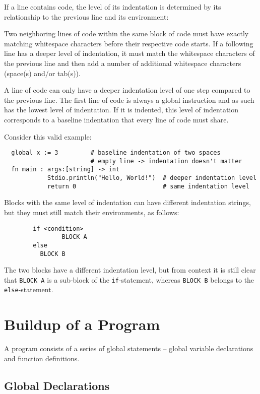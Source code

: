 \documentclass{article}
\newcommand{\code}[1]{\lstinline[columns=fixed]{#1}}
\begin{document}
		If a line contains code, the level of its indentation is determined by its relationship to the previous line and its environment:
		
		Two neighboring lines of code within the same block of code must have exactly matching whitespace characters before their respective code starts. If a following line has a deeper level of indentation, it must match the whitespace characters of the previous line and then add a number of additional whitespace characters (space(s) and/or tab(s)).
		
		A line of code can only have a deeper indentation level of one step compared to the previous line. The first line of code is always a global instruction and as such has the lowest level of indentation. If it is indented, this level of indentation corresponds to a baseline indentation that every line of code must share.
		
		Consider this valid example:
		
		\begin{lstlisting}
  global x := 3 		# baseline indentation of two spaces
						# empty line -> indentation doesn't matter
  fn main : args:[string] -> int
  			Stdio.println("Hello, World!")	# deeper indentation level
  			return 0						# same indentation level
		\end{lstlisting}
		
		Blocks with the same level of indentation can have different indentation strings, but they must still match their environments, as follows:
		
		\begin{lstlisting}
		if <condition>
				BLOCK A
		else
		  BLOCK B
		\end{lstlisting}
		
		The two blocks have a different indentation level, but from context it is still clear that \code{BLOCK A} is a sub-block of the \code{if}-statement, whereas \code{BLOCK B} belongs to the \code{else}-statement.
		
	\section{Buildup of a Program}
	
		A program consists of a series of global statements -- global variable declarations and function definitions.
		
		\subsection{Global Declarations}
		
\end{document}
